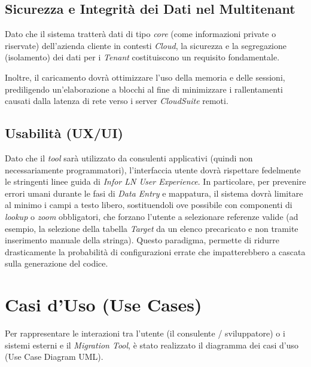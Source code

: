 \subsection{Sicurezza e Integrità dei Dati nel Multitenant}\label{subsec:sicurezza-e-integrita-dei-dati-nel-multitenant}
Dato che il sistema tratterà dati di tipo \textit{core} (come informazioni private o riservate) dell'azienda cliente in contesti
\textit{Cloud}, la sicurezza e la segregazione (isolamento) dei dati per i \textit{Tenant} costituiscono un requisito fondamentale.%

Inoltre, il caricamento dovrà ottimizzare l'uso della memoria e delle sessioni, prediligendo %
un'elaborazione a blocchi al fine di minimizzare i rallentamenti causati dalla latenza di rete verso i server \textit{CloudSuite} remoti.

\subsection{Usabilità (UX/UI)}
Dato che il \textit{tool} sarà utilizzato da consulenti applicativi (quindi non necessariamente programmatori), l'interfaccia utente dovrà rispettare fedelmente le stringenti linee guida di \textit{Infor LN User Experience}. 
In particolare, per prevenire errori umani durante le fasi di \textit{Data Entry} e mappatura, il sistema dovrà limitare al minimo i campi a testo libero, sostituendoli ove possibile con 
componenti di \textit{lookup} o \textit{zoom} obbligatori, che forzano l'utente a selezionare referenze valide (ad esempio, la selezione della tabella \textit{Target} da un elenco precaricato e non tramite inserimento manuale della stringa). 
Questo paradigma, permette di ridurre drasticamente la probabilità di configurazioni errate che impatterebbero a cascata sulla generazione del codice.

\section{Casi d'Uso (Use Cases)}
Per rappresentare le interazioni tra l'utente (il consulente / sviluppatore) o i sistemi esterni e il \textit{Migration Tool}, è stato realizzato il diagramma dei casi d'uso (Use Case Diagram UML).

